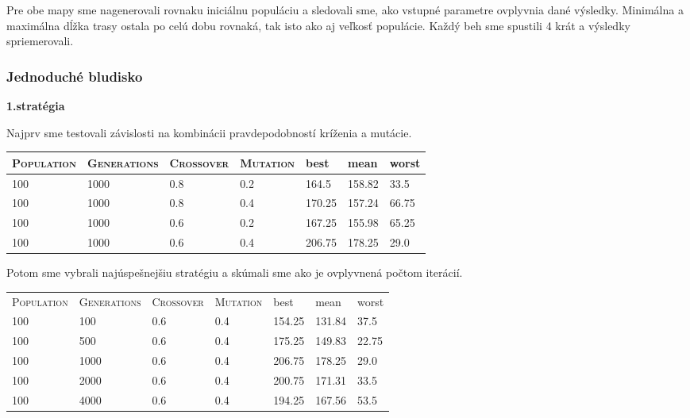 \documentclass[10pt]{paper}
\begin{document}
Pre obe mapy sme nagenerovali rovnaku iniciálnu populáciu a sledovali sme, ako vstupné parametre ovplyvnia dané výsledky. Minimálna a maximálna dĺžka trasy ostala po celú dobu rovnaká, tak isto ako aj veľkosť populácie. Každý beh sme spustili 4 krát a výsledky spriemerovali. 

\subsubsection{Jednoduché bludisko}

\textbf{1.stratégia}

Najprv sme testovali závislosti na kombinácii pravdepodobností kríženia a mutácie.\\
\begin{center}
\begin{tabular}{|llll|lll|}
\hline
\textsc{Population} & \textsc{Generations} & \textsc{Crossover} & \textsc{Mutation}  & best & mean & worst \\ \hline
100 & 1000 & 0.8 & 0.2 & 164.5 & 158.82 & 33.5\\ 
100 & 1000 & 0.8 & 0.4 & 170.25 & 157.24 & 66.75\\
100 & 1000 & 0.6 & 0.2 & 167.25 & 155.98 & 65.25\\
100 & 1000 & 0.6 & 0.4 & 206.75 & 178.25 & 29.0\\ \hline
\end{tabular}
\end{center}

Potom sme vybrali najúspešnejšiu stratégiu a skúmali sme ako je ovplyvnená počtom iterácií.

\begin{center}
\begin{tabular}{|llll|lll|}
\hline
\textsc{Population} & \textsc{Generations} & \textsc{Crossover} & \textsc{Mutation}  & best & mean & worst \\
100 & 100 & 0.6 & 0.4 & 154.25 &   131.84 &   37.5 \\
100 & 500 & 0.6 & 0.4 & 175.25  & 149.83 & 22.75\\
100 & 1000 & 0.6 & 0.4 & 206.75 & 178.25 & 29.0\\ 
100 & 2000 & 0.6 & 0.4 & 200.75 & 171.31 & 33.5\\
100 & 4000 & 0.6 & 0.4 & 194.25 & 167.56 & 53.5\\ \hline

\end{tabular}
\end{center}
\end{document}
